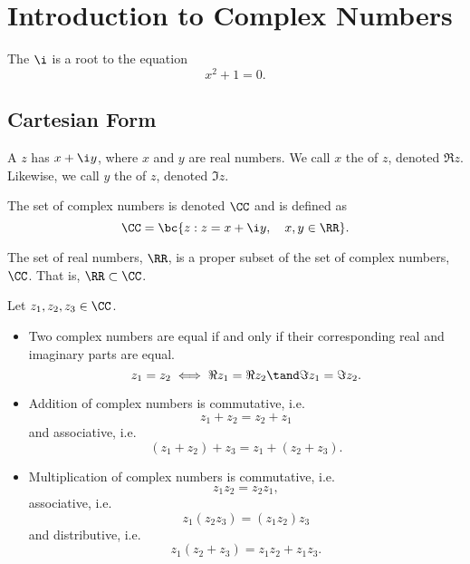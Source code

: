 \chapter{Introduction to Complex Numbers}\label{chap:Introduction-to-Complex-Numbers}

\begin{definition}
    The  $\i$ is a root to the equation \[x^2 + 1 = 0.\]
\end{definition}

\section{Cartesian Form}

\begin{definition}
    A  $z$ has  $x + \i y$, where $x$ and $y$ are real numbers. We call $x$ the  of $z$, denoted $\Re z$. Likewise, we call $y$ the  of $z$, denoted $\Im z$.
\end{definition}

\begin{definition}
    The set of complex numbers is denoted $\CC$ and is defined as \[\CC = \bc{z : z = x + \i y , \quad x, y \in \RR}.\]
\end{definition}
\begin{remark}
    The set of real numbers, $\RR$, is a proper subset of the set of complex numbers, $\CC$. That is, $\RR \subset \CC$.
\end{remark}

\begin{fact}
    Let $z_1, z_2, z_3 \in \CC$.
    \begin{itemize}
        \item Two complex numbers are equal if and only if their corresponding real and imaginary parts are equal. \[z_1 = z_2 \iff \Re z_1 = \Re z_2 \tand \Im z_1 = \Im z_2.\]
        \item Addition of complex numbers is commutative, i.e. \[z_1 + z_2 = z_2 + z_1\] and associative, i.e. \[(z_1 + z_2) + z_3 = z_1 + (z_2 + z_3).\]
        \item Multiplication of complex numbers is commutative, i.e. \[z_1z_2 = z_2z_1,\] associative, i.e. \[z_1(z_2z_3) = (z_1z_2)z_3\] and distributive, i.e. \[z_1(z_2 + z_3) = z_1z_2 + z_1z_3.\]
    \end{itemize}
\end{fact}

